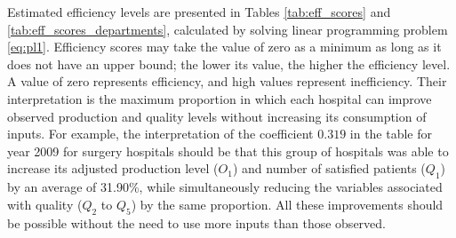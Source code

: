 \documentclass[11pt,a4paper,oneside]{article}
\begin{document}


Estimated efficiency levels are presented in Tables \ref{tab:eff_scores} and \ref{tab:eff_scores_departments}, calculated by solving linear programming problem \eqref{eq:pl1}. Efficiency scores may take the value of zero as a minimum as long as it does not have an upper bound; the lower its value, the higher the efficiency level. A value of zero represents efficiency, and high values represent inefficiency. Their interpretation is the maximum proportion in which each hospital can improve observed production and quality levels without increasing its consumption of inputs. For example, the interpretation of the coefficient $0.319$ in the table for year 2009 for surgery hospitals should be that this group of hospitals was able to increase its adjusted production level ($O_1$) and number of satisfied patients ($Q_1$) by an average of 31.90\%, while simultaneously reducing the variables associated with quality ($Q_2$ to $Q_5$) by the same proportion. All these improvements should be possible without the need to use more inputs than those observed.
% 
% 



\end{document}
